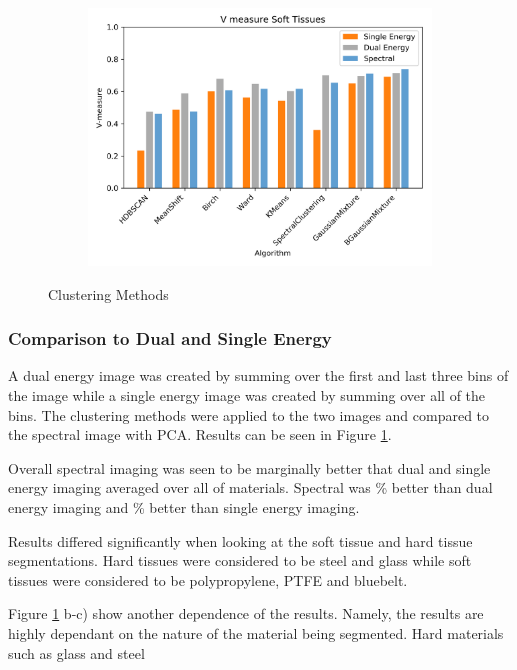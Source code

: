 \documentclass[a4paper,11pt]{article}
\begin{document}
\begin{figure}[b!]
\begin{subfigure}[b]{0.32\textwidth}
    \end{subfigure}
    \begin{subfigure}[b]{0.32\textwidth}
        \includegraphics[width=\textwidth]{figures/soft_comparison.png}
    \end{subfigure}
    \caption{Clustering Methods}
    \label{results:hard_soft}
\end{figure}

\subsubsection{Comparison to Dual and Single Energy}

A dual energy image was created by summing over the first and last three bins of the image while a single energy image was created by summing over all of the bins. The clustering methods were applied to the two images and compared to the spectral image with PCA. Results can be seen in Figure \ref{results:hard_soft}.

Overall spectral imaging was seen to be marginally better that dual and single energy imaging averaged over all of materials. Spectral was \% better than dual energy imaging and \% better than single energy imaging.

Results differed significantly when looking at the soft tissue and hard tissue segmentations. Hard tissues were considered to be steel and glass while soft tissues were considered to be polypropylene, PTFE and bluebelt.

Figure \ref{results:hard_soft} b-c) show another dependence of the results. Namely, the results are highly dependant on the nature of the material being segmented. Hard materials such as glass and steel
\end{document}
